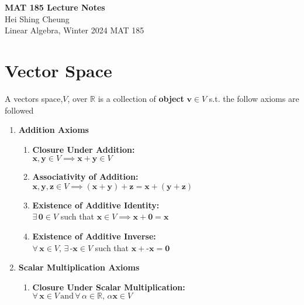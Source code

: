 \documentclass[11pt]{article}
\begin{document}
\thispagestyle{empty}
{\LARGE \bf MAT 185 Lecture Notes}\\
{\large Hei Shing Cheung}\\
Linear Algebra, Winter 2024 \hfill MAT 185\\
\section{Vector Space}
\begin{definition}
    A vectors space,${V}$, over $\mathbb{R}$ is a collection of \textbf{object} $\textbf{v} \in V$ s.t. the follow axioms are followed
    \begin{enumerate}
        \item \textbf{Addition Axioms}
        \begin{enumerate}
            \item \textbf{Closure Under Addition:} \\
            $\textbf{x}, \textbf{y} \in V \implies \textbf{x} + \textbf{y} \in V$
            
            \item \textbf{Associativity of Addition:} \\
            $\textbf{x}, \textbf{y}, \textbf{z} \in V \implies (\textbf{x} + \textbf{y}) + \textbf{z} = \textbf{x} + (\textbf{y} + \textbf{z})$
            
            \item \textbf{Existence of Additive Identity:} \\
            $\exists \, \textbf{0} \in V$ such that $\textbf{x} \in V \implies \textbf{x} + \textbf{0} = \textbf{x}$
            
            \item \textbf{Existence of Additive Inverse:} \\
            $\forall \, \textbf{x} \in V, \, \exists \, \textbf{-x} \in V$ such that $\textbf{x} + \textbf{-x} = \textbf{0}$
        \end{enumerate}
        
        \item \textbf{Scalar Multiplication Axioms}
        \begin{enumerate}
            \item \textbf{Closure Under Scalar Multiplication:} \\
            $\forall \, \textbf{x} \in V \, \text{and} \, \forall \, \alpha \in \mathbb{R}, \, \alpha \textbf{x} \in V$
            

\end{enumerate}
\end{enumerate}
\end{definition}
\end{document}
